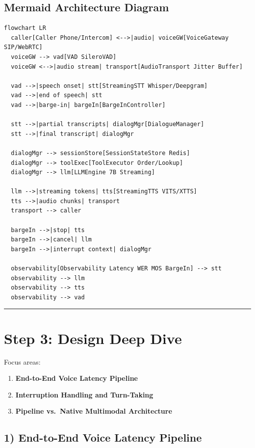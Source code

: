 \subsection*{Mermaid Architecture Diagram}

\begin{verbatim}
flowchart LR
  caller[Caller Phone/Intercom] <-->|audio| voiceGW[VoiceGateway SIP/WebRTC]
  voiceGW --> vad[VAD SileroVAD]
  voiceGW <-->|audio stream| transport[AudioTransport Jitter Buffer]

  vad -->|speech onset| stt[StreamingSTT Whisper/Deepgram]
  vad -->|end of speech| stt
  vad -->|barge-in| bargeIn[BargeInController]

  stt -->|partial transcripts| dialogMgr[DialogueManager]
  stt -->|final transcript| dialogMgr

  dialogMgr --> sessionStore[SessionStateStore Redis]
  dialogMgr --> toolExec[ToolExecutor Order/Lookup]
  dialogMgr --> llm[LLMEngine 7B Streaming]

  llm -->|streaming tokens| tts[StreamingTTS VITS/XTTS]
  tts -->|audio chunks| transport
  transport --> caller

  bargeIn -->|stop| tts
  bargeIn -->|cancel| llm
  bargeIn -->|interrupt context| dialogMgr

  observability[Observability Latency WER MOS BargeIn] --> stt
  observability --> llm
  observability --> tts
  observability --> vad
\end{verbatim}

\bigskip\hrule\bigskip

\section*{Step 3: Design Deep Dive}

Focus areas:
\begin{enumerate}
  \item \textbf{End-to-End Voice Latency Pipeline}
  \item \textbf{Interruption Handling and Turn-Taking}
  \item \textbf{Pipeline vs.\ Native Multimodal Architecture}
\end{enumerate}

\subsection*{1) End-to-End Voice Latency Pipeline}

